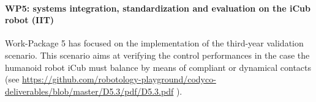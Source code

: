 \paragraph{WP5: systems integration, standardization and evaluation on the iCub robot (IIT)}

Work-Package 5 has focused on the implementation of the third-year validation scenario. This  scenario aims at verifying the control performances in the case the humanoid robot iCub must balance by means of compliant or dynamical contacts (see  \url{https://github.com/robotology-playground/codyco-deliverables/blob/master/D5.3/pdf/D5.3.pdf} \cite{deliverable53}). 

